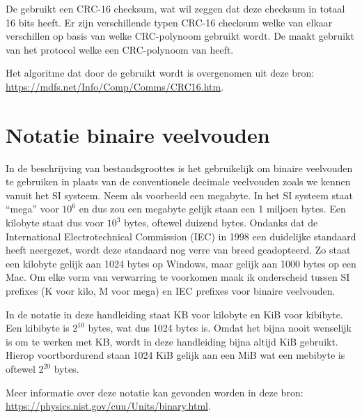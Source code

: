 De \product gebruikt een CRC-16 checksum, wat wil zeggen dat deze checksum in totaal 16 bits heeft. Er zijn verschillende typen CRC-16 checksum welke van elkaar verschillen op basis van welke CRC-polynoom gebruikt wordt. De \product maakt gebruikt van het  protocol welke een CRC-polynoom van  heeft.

Het algoritme dat door de \product gebruikt wordt is overgenomen uit deze bron: \url{https://mdfs.net/Info/Comp/Comms/CRC16.htm}.

%
%
%
\section{Notatie binaire veelvouden}
\label{sec:prefixes_binary_multiples}


In de beschrijving van bestandsgroottes is het gebruikelijk om binaire veelvouden te gebruiken in plaats van de conventionele decimale veelvouden zoals we kennen vanuit het SI systeem. Neem als voorbeeld een megabyte. In het SI systeem staat ``mega'' voor $10^{6}$ en dus zou een megabyte gelijk staan een 1 miljoen bytes. Een kilobyte staat dus voor $10^{3}$ bytes, oftewel duizend bytes. Ondanks dat de International Electrotechnical Commission (IEC) in 1998 een duidelijke standaard heeft neergezet, wordt deze standaard nog verre van breed geadopteerd. Zo staat een kilobyte gelijk aan 1024 bytes op Windows, maar gelijk aan 1000 bytes op een Mac. Om elke vorm van verwarring te voorkomen maak ik onderscheid tussen SI prefixes (K voor kilo, M voor mega) en IEC prefixes voor binaire veelvouden.

In de notatie in deze handleiding staat KB voor kilobyte en KiB voor kibibyte. Een kibibyte is $2^{10}$ bytes, wat dus 1024 bytes is. Omdat het bijna nooit wenselijk is om te werken met KB, wordt in deze handleiding bijna altijd KiB gebruikt. Hierop voortbordurend staan 1024 KiB gelijk aan een MiB wat een mebibyte is oftewel $2^{20}$ bytes.

Meer informatie over deze notatie kan gevonden worden in deze bron: \url{https://physics.nist.gov/cuu/Units/binary.html}.